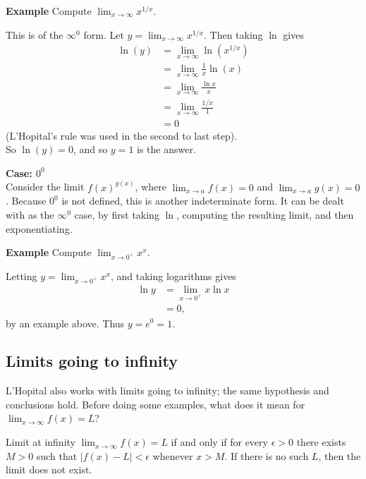\documentclass[twoside,openright,titlepage,a4paper]{book}
\begin{document}
\begin{sloppypar}
\textbf{Example} Compute $\displaystyle \lim_{x \rightarrow \infty} x^{1/x}$. 
\begin{examplebox}
This is of the $\infty^0$ form. Let $\displaystyle y = \lim_{x \rightarrow \infty} x^{1/x}$. Then taking $\ln$ gives
\begin{align*}
\ln(y) &= \lim_{x \rightarrow \infty} \ln\left(x^{1/x}\right) \\
&= \lim_{x \rightarrow \infty} \frac{1}{x}\ln(x) \\
&= \lim_{x \rightarrow \infty} \frac{\ln x}{x} \\
&= \lim_{x \rightarrow \infty} \frac{1/x}{1} \\
&= 0 
\end{align*}
(L'Hopital's rule was used in the second to last step).\\
So $\ln(y) = 0$, and so $y = 1$ is the answer.
\end{examplebox}
\bigbreak
\noindent \textbf{Case: $0^0$}\\

Consider the limit $\displaystyle f(x)^{g\left(x\right)}$, where $\displaystyle \lim_{x \rightarrow a} f(x) = 0$ and $\displaystyle \lim_{x \rightarrow a} g(x) = 0$. Because $0^0$ is not defined, this is another indeterminate form. It can be dealt with as the $\infty^0$ case, by first taking $\ln$, computing the resulting limit, and then exponentiating.

\textbf{Example} Compute $\displaystyle \lim_{x \rightarrow 0^+} x^x$. 
\begin{examplebox}
Letting $\displaystyle y = \lim_{x \rightarrow 0^+} x^x$, and taking logarithms gives
\begin{align*}
\ln y &= \lim_{x \rightarrow 0^+} x \ln x \\
&= 0, 
\end{align*}
by an example above. Thus $y = e^0 = 1$.
\end{examplebox}

\subsection{Limits going to infinity}
L'Hopital also works with limits going to infinity; the same hypothesis and conclusions hold. Before doing some examples, what does it mean for $\displaystyle \lim_{x \rightarrow \infty} f(x) = L$?
\begin{definitionbox}
Limit at infinity $\displaystyle \lim_{x \rightarrow \infty} f(x) = L$ if and only if for every $\epsilon>0$ there exists $M>0$ such that $|f(x)-L|<\epsilon$ whenever $x>M$. If there is no such $L$, then the limit does not exist.
\end{definitionbox}


\end{sloppypar}
\end{document}
